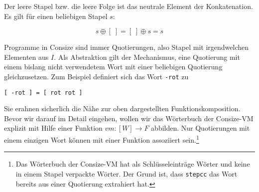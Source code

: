 Der leere Stapel bzw. die leere Folge ist das neutrale Element der Konkatenation. Es gilt für einen beliebigen Stapel $s$:

\begin{equation}
s\oplus[\;] = [\;]\oplus s = s
\end{equation}


Programme in Consize sind immer Quotierungen, also Stapel mit irgendwelchen Elementen aus $I$. Als Abstraktion gilt der Mechanismus, eine Quotierung mit einem bislang nicht verwendetem Wort mit einer beliebigen Quotierung gleichzusetzen. Zum Beispiel definiert sich das Wort \verb|-rot| zu

\verb|[ -rot ] = [ rot rot ]|

Sie erahnen sicherlich die Nähe zur oben dargestellten Funktionskomposition. Bevor wir darauf im Detail eingehen, wollen wir das Wörterbuch der Consize-VM explizit mit Hilfe einer Funktion $vm: [ W ] \rightarrow F$ abbilden. Nur Quotierungen mit einem einzigen Wort können mit einer Funktion assoziiert sein.\footnote{Das Wörterbuch der Consize-VM hat als Schlüsseleinträge Wörter und keine in einem Stapel verpackte Wörter. Der Grund ist, dass \texttt{stepcc} das Wort bereits aus einer Quotierung extrahiert hat.}

